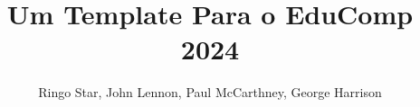 \documentclass[sigconf]{educomp}
\begin{document}
\title[Título curto, caso necessário]{Um Template Para o EduComp 2024}


\author{Ringo Star, John Lennon, Paul McCarthney, George Harrison}


\newcommand{\showDOI}[1]{\unskip}


\begin{abstract}



\end{abstract}


\maketitle















\end{document}
